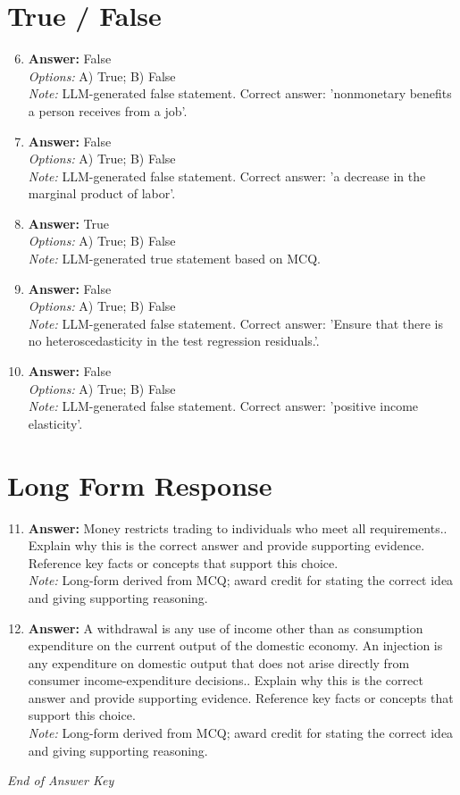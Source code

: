 \documentclass[12pt]{article}
\begin{document}
\section*{True / False}
\begin{enumerate}[label=\arabic*.]
\setcounter{enumi}{5}
\item \textbf{Answer:} False
\\ \textit{Options:} A) True; B) False
\\ \textit{Note:} LLM-generated false statement. Correct answer: 'nonmonetary benefits a person receives from a job'.
\item \textbf{Answer:} False
\\ \textit{Options:} A) True; B) False
\\ \textit{Note:} LLM-generated false statement. Correct answer: 'a decrease in the marginal product of labor'.
\item \textbf{Answer:} True
\\ \textit{Options:} A) True; B) False
\\ \textit{Note:} LLM-generated true statement based on MCQ.
\item \textbf{Answer:} False
\\ \textit{Options:} A) True; B) False
\\ \textit{Note:} LLM-generated false statement. Correct answer: 'Ensure that there is no heteroscedasticity in the test regression residuals.'.
\item \textbf{Answer:} False
\\ \textit{Options:} A) True; B) False
\\ \textit{Note:} LLM-generated false statement. Correct answer: 'positive income elasticity'.
\end{enumerate}

\section*{Long Form Response}
\begin{enumerate}[label=\arabic*.]
\setcounter{enumi}{10}
\item \textbf{Answer:} Money restricts trading to individuals who meet all requirements.. Explain why this is the correct answer and provide supporting evidence. Reference key facts or concepts that support this choice.
\\ \textit{Note:} Long-form derived from MCQ; award credit for stating the correct idea and giving supporting reasoning.
\item \textbf{Answer:} A withdrawal is any use of income other than as consumption expenditure on the current output of the domestic economy. An injection is any expenditure on domestic output that does not arise directly from consumer income-expenditure decisions.. Explain why this is the correct answer and provide supporting evidence. Reference key facts or concepts that support this choice.
\\ \textit{Note:} Long-form derived from MCQ; award credit for stating the correct idea and giving supporting reasoning.
\end{enumerate}

\vfill
\noindent\textit{End of Answer Key}
\end{document}

